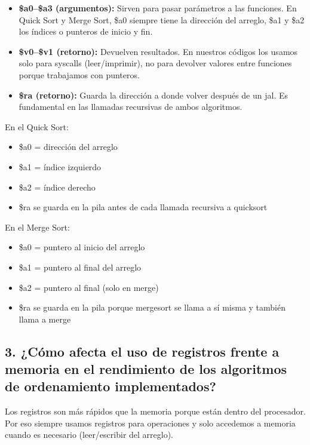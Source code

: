 \documentclass[12pt]{article}
\begin{document}
\begin{itemize}
    \item \textbf{\$a0–\$a3 (argumentos):} Sirven para pasar parámetros a las funciones. En Quick Sort y Merge Sort, \$a0 siempre tiene la dirección del arreglo, \$a1 y \$a2 los índices o punteros de inicio y fin.
    
    \item \textbf{\$v0–\$v1 (retorno):} Devuelven resultados. En nuestros códigos los usamos solo para syscalls (leer/imprimir), no para devolver valores entre funciones porque trabajamos con punteros.
    
    \item \textbf{\$ra (retorno):} Guarda la dirección a donde volver después de un jal. Es fundamental en las llamadas recursivas de ambos algoritmos.
\end{itemize}

En el Quick Sort:

\begin{itemize}
    \item \$a0 = dirección del arreglo
    \item \$a1 = índice izquierdo
    \item \$a2 = índice derecho
    \item \$ra se guarda en la pila antes de cada llamada recursiva a quicksort
\end{itemize}

En el Merge Sort:

\begin{itemize}
    \item \$a0 = puntero al inicio del arreglo
    \item \$a1 = puntero al final del arreglo
    \item \$a2 = puntero al final (solo en merge)
    \item \$ra se guarda en la pila porque mergesort se llama a sí misma y también llama a merge
\end{itemize}

\subsection*{3. ¿Cómo afecta el uso de registros frente a memoria en el rendimiento de los algoritmos de ordenamiento implementados?}

Los registros son más rápidos que la memoria porque están dentro del procesador. Por eso siempre usamos registros para operaciones y solo accedemos a memoria cuando es necesario (leer/escribir del arreglo).
\end{document}
